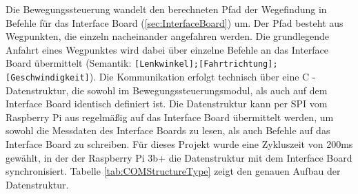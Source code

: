 Die Bewegungssteuerung wandelt den berechneten Pfad der Wegefindung in Befehle für das Interface Board (\ref{sec:InterfaceBoard}) um. Der Pfad besteht aus Wegpunkten, die einzeln nacheinander angefahren werden. Die grundlegende Anfahrt eines Wegpunktes wird dabei über einzelne Befehle an das Interface Board übermittelt (Semantik: \texttt{[Lenkwinkel];[Fahrtrichtung];[Geschwindigkeit]}). Die Kommunikation erfolgt technisch über eine C - Datenstruktur, die sowohl im Bewegungssteuerungsmodul, als auch auf dem Interface Board identisch definiert ist. Die Datenstruktur kann per SPI vom Raspberry Pi aus regelmäßig auf das Interface Board übermittelt werden, um sowohl die Messdaten des Interface Boards zu lesen, als auch Befehle auf das Interface Board zu schreiben. Für dieses Projekt wurde eine Zykluszeit von 200ms gewählt, in der der Raspberry Pi 3b+ die Datenstruktur mit dem Interface Board synchronisiert. Tabelle \ref{tab:COMStructureType} zeigt den genauen Aufbau der Datenstruktur.

